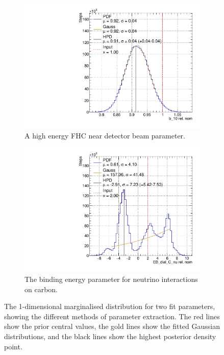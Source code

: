 \begin{figure}
\centering
\begin{subfigure}{.5\textwidth}
  \centering
  \includegraphics[width=0.95\linewidth]{figs/b_10}
  \caption{A high energy FHC near detector beam parameter.}
  \label{fig:b10}
\end{subfigure}%
\begin{subfigure}{.5\textwidth}
  \centering
  \includegraphics[width=0.95\linewidth]{figs/EB_dial_C_nuData}
  \caption{The binding energy parameter for neutrino interactions on carbon.}
  \label{fig:Eb}
\end{subfigure}
\caption{The 1-dimensional marginalised distribution for two fit parameters, showing the different methods of parameter extraction. The red lines show the prior central values, the gold lines show the fitted Gaussian distributions, and the black lines show the highest posterior density point.}
\label{fig:1dposts}
\end{figure}

